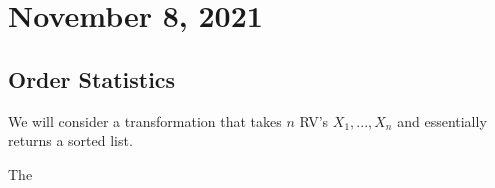 \section{November 8, 2021}
\subsection{Order Statistics}
We will consider a transformation that takes  $n$ RV's $X_1,...,X_n$ and essentially returns a sorted list. 
\begin{definition}
The 
\end{definition}